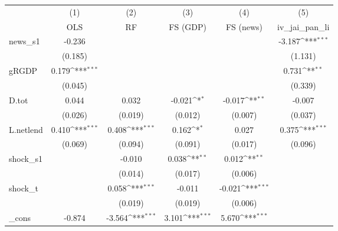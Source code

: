{
\def\sym#1{\ifmmode^{#1}\else\(^{#1}\)\fi}
\begin{tabular}{l*{5}{c}}
\toprule
            &\multicolumn{1}{c}{(1)}&\multicolumn{1}{c}{(2)}&\multicolumn{1}{c}{(3)}&\multicolumn{1}{c}{(4)}&\multicolumn{1}{c}{(5)}\\
            &\multicolumn{1}{c}{OLS}&\multicolumn{1}{c}{RF}&\multicolumn{1}{c}{FS (GDP)}&\multicolumn{1}{c}{FS (news)}&\multicolumn{1}{c}{iv\_jai\_pan\_li}\\
\midrule
news\_s1     &      -0.236         &                     &                     &                     &      -3.187\sym{***}\\
            &     (0.185)         &                     &                     &                     &     (1.131)         \\
\addlinespace
gRGDP       &       0.179\sym{***}&                     &                     &                     &       0.731\sym{**} \\
            &     (0.045)         &                     &                     &                     &     (0.339)         \\
\addlinespace
D.tot       &       0.044         &       0.032         &      -0.021\sym{*}  &      -0.017\sym{**} &      -0.007         \\
            &     (0.026)         &     (0.019)         &     (0.012)         &     (0.007)         &     (0.037)         \\
\addlinespace
L.netlend   &       0.410\sym{***}&       0.408\sym{***}&       0.162\sym{*}  &       0.027         &       0.375\sym{***}\\
            &     (0.069)         &     (0.094)         &     (0.091)         &     (0.017)         &     (0.096)         \\
\addlinespace
shock\_s1    &                     &      -0.010         &       0.038\sym{**} &       0.012\sym{**} &                     \\
            &                     &     (0.014)         &     (0.017)         &     (0.006)         &                     \\
\addlinespace
shock\_t     &                     &       0.058\sym{***}&      -0.011         &      -0.021\sym{***}&                     \\
            &                     &     (0.019)         &     (0.019)         &     (0.006)         &                     \\
\addlinespace
\_cons      &      -0.874         &      -3.564\sym{***}&       3.101\sym{***}&       5.670\sym{***}&                     \\

\end{tabular}}
